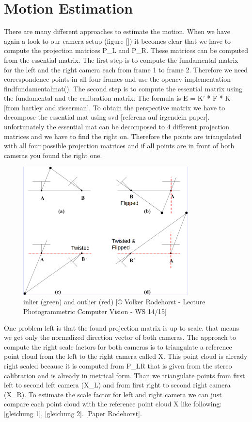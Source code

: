 \documentclass[11pt]{article}
\begin{document}
	\section{Motion Estimation}
	
	There are many different approaches to estimate the motion. 
	When we have again a look to our camera setup (figure []) it becomes clear that we have to compute the projection matrices P\_L and P\_R. These matrices can be computed from the essential matrix. The first step is to compute the fundamental matrix for the left and the right camera each from frame 1 to frame 2. Therefore we need correspondence points in all four frames and use the opencv implementation findfundamentalmat(). The second step is to compute the essential matrix using the fundamental and the calibration matrix. The formula is E = K’ * F * K [from hartley and zisserman].
	To obtain the perspective matrix we have to decompose the essential mat using svd [referenz auf irgendein paper].
	unfortunately the essential mat can be decomposed to 4 different projection matrices and we have to find the right on. Therefore the points are triangulated with all four possible projection matrices and if all points are in front of both cameras you found the right one. 
	
	\begin{figure}[ht!]
		\centering
		\includegraphics[width=90mm]{images/possible_P_Mats.png}
		\caption{inlier (green) and outlier (red) [© Volker Rodehorst - Lecture Photogrammetric Computer Vision - WS 14/15]
			 \label{overflow}}
	\end{figure}
	One problem left is that the found projection matrix is up to scale. that means we get only the normalized direction vector of both cameras.
	The approach to compute the right scale factors for both cameras is to triangulate a reference point cloud from the left to the right camera called X. This point cloud is already right scaled because it is computed from P\_LR that is given from the stereo calibration and is already in metrical form. Than we triangulate points from first left to second left camera (X\_L) and from first right to second right camera (X\_R).  To estimate the scale factor for left and right camera we can just compare each point cloud with the reference point cloud X like following:
	[gleichung 1], [gleichung 2].  [Paper Rodehorst].
	
\end{document}
